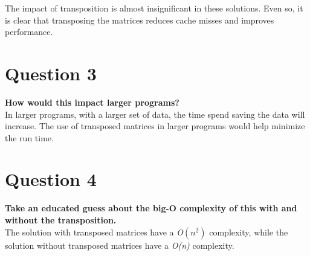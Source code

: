 \documentclass{article}
\begin{document}

The impact of transposition is almost insignificant in these solutions. Even so, it is clear that transposing the matrices reduces cache misses and improves performance. \\


\section{Question 3}

\textbf{How would this impact larger programs?} \\


In larger programs, with a larger set of data, the time spend saving the data will increase. The use of transposed matrices in larger programs would help minimize the run time. \\


\section{Question 4}

\textbf{Take an educated guess about the big-O complexity of this with and without the transposition.} \\


The solution with transposed matrices have a \textit{O$(n^2)$} complexity, while the solution without transposed matrices have a \textit{O(n)} complexity. \\
\end{document}
